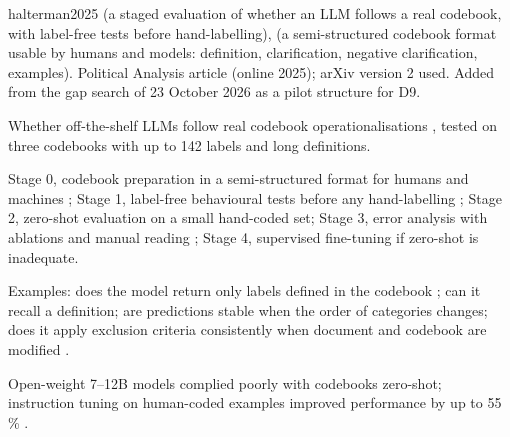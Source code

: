 \begin{papercard}{halterman2025}
  (a staged evaluation of whether an LLM follows a real codebook, with label-free tests before hand-labelling),  (a semi-structured codebook format usable by humans and models: definition, clarification, negative clarification, examples). Political Analysis article (online 2025); arXiv version 2 used. Added from the gap search of 23 October 2026 as a pilot structure for D9.

 Whether off-the-shelf LLMs follow real codebook operationalisations , tested on three codebooks with up to 142 labels and long definitions.

 Stage 0, codebook preparation in a semi-structured format for humans and machines ; Stage 1, label-free behavioural tests before any hand-labelling ; Stage 2, zero-shot evaluation on a small hand-coded set; Stage 3, error analysis with ablations and manual reading ; Stage 4, supervised fine-tuning if zero-shot is inadequate.

 Examples: does the model return only labels defined in the codebook ; can it recall a definition; are predictions stable when the order of categories changes; does it apply exclusion criteria consistently when document and codebook are modified .

 Open-weight 7--12B models complied poorly with codebooks zero-shot; instruction tuning on human-coded examples improved performance by up to 55\,\% .


\end{papercard}
